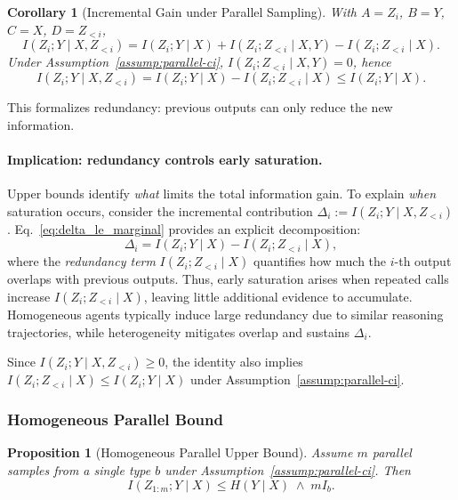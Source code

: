 \documentclass{article}
\theoremstyle{plain}
\newtheorem{proposition}[theorem]{Proposition}
\newtheorem{corollary}[theorem]{Corollary}
\theoremstyle{definition}
\theoremstyle{remark}
\begin{document}
\begin{corollary}[Incremental Gain under Parallel Sampling]
\label{cor:parallel-identity}
With $A=Z_i$, $B=Y$, $C=X$, $D=Z_{<i}$,
\begin{equation}
I(Z_i;Y\mid X,Z_{<i})
=
I(Z_i;Y\mid X)
+
I(Z_i;Z_{<i}\mid X,Y)
-
I(Z_i;Z_{<i}\mid X).
\label{eq:parallel-identity}
\end{equation}
Under Assumption~\ref{assump:parallel-ci}, $I(Z_i;Z_{<i}\mid X,Y)=0$, hence
\begin{equation}
I(Z_i;Y\mid X,Z_{<i})
= I(Z_i;Y\mid X) - I(Z_i;Z_{<i}\mid X)
\le I(Z_i;Y\mid X).
\label{eq:delta_le_marginal}
\end{equation}
\end{corollary}

\noindent This formalizes redundancy: previous outputs can only reduce the new information. 


\paragraph{Implication: redundancy controls early saturation.}
Upper bounds identify \emph{what} limits the total information gain.
To explain \emph{when} saturation occurs, consider the incremental contribution
$\Delta_i := I(Z_i;Y\mid X,Z_{<i})$.
Eq.~\eqref{eq:delta_le_marginal} provides an explicit decomposition:
\begin{equation}
\Delta_i
= I(Z_i;Y\mid X) - I(Z_i;Z_{<i}\mid X),
\label{eq:redundancy_identity_main_app}
\end{equation}
where the \emph{redundancy term} $I(Z_i;Z_{<i}\mid X)$ quantifies how much the $i$-th output overlaps with previous outputs.
Thus, early saturation arises when repeated calls increase $I(Z_i;Z_{<i}\mid X)$, leaving little additional evidence to accumulate.
Homogeneous agents typically induce large redundancy due to similar reasoning trajectories, while heterogeneity mitigates overlap and sustains $\Delta_i$.



Since $I(Z_i;Y\mid X,Z_{<i})\ge 0$, the identity also implies
$I(Z_i;Z_{<i}\mid X)\le I(Z_i;Y\mid X)$ under Assumption~\ref{assump:parallel-ci}.

\subsubsection{Homogeneous Parallel Bound}
\label{app:homog-parallel}

\begin{proposition}[Homogeneous Parallel Upper Bound]
\label{prop:homog-parallel}
Assume $m$ parallel samples from a single type $b$ under Assumption~\ref{assump:parallel-ci}.
Then
\begin{equation}
I(Z_{1:m};Y\mid X)\le H(Y\mid X) \;\wedge\; mI_b.
\label{eq:homog-parallel}
\end{equation}
\end{proposition}
\end{document}
